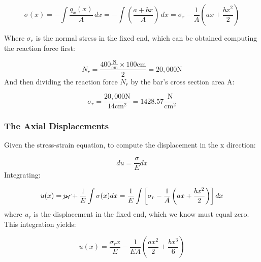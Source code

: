 \[
  \sigma(x) = - \int \frac{q_x(x)}{A} \,dx 
  = - \int \left( \frac{a + bx}{A} \right) \,dx 
  = \sigma_r - \frac{1}{A} \left( ax + \frac{b x^2}{2} \right)
\]

Where $\sigma_r$ is the normal stress in the fixed end, which can be obtained computing the reaction force first:

\[
  N_r = \frac{400 \frac{\text{N}}{\text{cm}} \times 100 \text{cm}}{2} = 20,000 \text{N}
\]
And then dividing the reaction force $N_r$ by the bar's cross section area A:

\[
  \sigma_r = \frac{20,000 \text{N}}{14 \text{cm}^2} = 1428.57 \frac{\text{N}}{\text{cm}^2}
\]


\subsubsection{The Axial Displacements}

Given the stress-strain equation, to compute the displacement in the x direction:

\[
  du = \frac{\sigma}{E} dx  
\]
Integrating:

\[
  u(x) = \cancel{u_r} + \frac{1}{E} \int \sigma(x) dx = \frac{1}{E} \int \left[ \sigma_r - \frac{1}{A} \left( ax + \frac{b x^2}{2} \right) \right] dx
\]
where $u_r$ is the displacement in the fixed end, which we know must equal zero.
This integration yields:

\[
  u(x) = \frac{\sigma_r x}{E} - \frac{1}{EA} \left( \frac{a x^2}{2} + \frac{b x^3}{6} \right)  
\]
